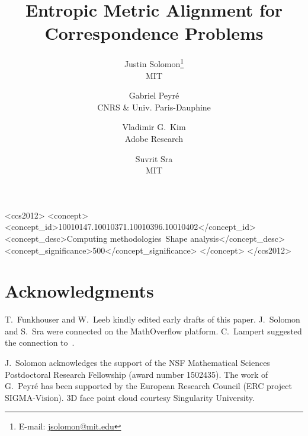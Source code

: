 \documentclass{acmsiggraph}
\title{Entropic Metric Alignment for Correspondence Problems}
\author{Justin Solomon\thanks{E-mail: \href{mailto:jsolomon@mit.edu}{jsolomon@mit.edu}}\\ MIT
\and
Gabriel Peyr\'e \\ CNRS \& Univ. Paris-Dauphine
\and
Vladimir G.\ Kim \\ Adobe Research
\and
Suvrit Sra \\ MIT
}
\begin{document}
\teaser{
}


\maketitle




\begin{CCSXML}
<ccs2012>
<concept>
<concept_id>10010147.10010371.10010396.10010402</concept_id>
<concept_desc>Computing methodologies~Shape analysis</concept_desc>
<concept_significance>500</concept_significance>
</concept>
</ccs2012>
\end{CCSXML}


\keywordlist

\conceptlist

\printcopyright








\section*{Acknowledgments}


T.\ Funkhouser and W.\ Leeb kindly edited early drafts of this paper.  J.\ Solomon and S.\ Sra were connected on the MathOverflow platform.  C.\ Lampert suggested the connection to~\cite{quadrianto-2009}.

J.\ Solomon acknowledges the support of the NSF Mathematical Sciences Postdoctoral Research Fellowship (award number 1502435).  The work of G.\ Peyr\'e has been supported by the European Research Council (ERC project SIGMA-Vision).  3D face point cloud courtesy Singularity University.

\appendix



\nocite{*}

\end{document}

